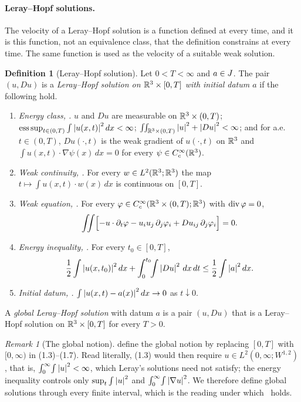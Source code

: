 \documentclass[11pt,letterpaper]{article}
\numberwithin{equation}{section}
\theoremstyle{plain}
\theoremstyle{definition}
\newtheorem{definition}[theorem]{Definition}
\theoremstyle{remark}
\newtheorem{remark}[theorem]{Remark}
\begin{document}
\paragraph{Leray--Hopf solutions.}
The velocity of a Leray--Hopf solution is a function defined at every time,
and it is this function, not an equivalence class, that the definition
constrains at every time. The same function is used as the velocity of a
suitable weak solution.

\begin{definition}[Leray--Hopf solution]\label{def:leray-hopf}
Let $0<T<\infty$ and $a\in J$. The pair $(u,Du)$ is a \emph{Leray--Hopf
solution on $\mathbb{R}^3\times[0,T]$ with initial datum $a$} if the following hold.
\begin{enumerate}[label=(LH\arabic*)]
\item\label{LH:class} \emph{Energy class, \cite[(1.3)]{ESS2003}.} $u$ and $Du$
  are measurable on $\mathbb{R}^3\times(0,T)$;
  $\operatorname*{ess\,sup}_{t\in(0,T)}\int\left\lvert u(x,t)\right\rvert^2dx<\infty$;
  $\iint_{\mathbb{R}^3\times(0,T)}\left\lvert u\right\rvert^2+\left\lvert Du\right\rvert^2<\infty$; and for a.e.\
  $t\in(0,T)$, $Du(\cdot,t)$ is the weak gradient of $u(\cdot,t)$ on $\mathbb{R}^3$
  and $\int u(x,t)\cdot\nabla\psi(x)\,dx=0$ for every $\psi\in C_c^\infty(\mathbb{R}^3)$.
\item\label{LH:weakcont} \emph{Weak continuity, \cite[(1.4)]{ESS2003}.} For
  every $w\in L^2(\mathbb{R}^3;\mathbb{R}^3)$ the map $t\mapsto\int u(x,t)\cdot w(x)\,dx$ is
  continuous on $[0,T]$.
\item\label{LH:eq} \emph{Weak equation, \cite[(1.5)]{ESS2003}.} For every
  $\varphi\in C_c^\infty(\mathbb{R}^3\times(0,T);\mathbb{R}^3)$ with $\operatorname{div}\varphi=0$,
  \[
  \iint\Bigl[-u\cdot\partial_t\varphi-u_iu_j\,\partial_j\varphi_i+Du_{ij}\,\partial_j\varphi_i\Bigr]=0 .
  \]
\item\label{LH:energy} \emph{Energy inequality, \cite[(1.6)]{ESS2003}.} For
  every $t_0\in[0,T]$,
  \[
  \frac12\int\left\lvert u(x,t_0)\right\rvert^2dx+\int_0^{t_0}\!\!\int\left\lvert Du\right\rvert^2\,dx\,dt\le\frac12\int\left\lvert a\right\rvert^2dx .
  \]
\item\label{LH:initial} \emph{Initial datum, \cite[(1.7)]{ESS2003}.}
  $\int\left\lvert u(x,t)-a(x)\right\rvert^2dx\to0$ as $t\downarrow0$.
\end{enumerate}
A \emph{global Leray--Hopf solution} with datum $a$ is a pair $(u,Du)$ that is
a Leray--Hopf solution on $\mathbb{R}^3\times[0,T]$ for every $T>0$.
\end{definition}

\begin{remark}[The global notion]\label{rem:global-LH}
\cite{ESS2003} define the global notion by replacing $[0,T]$ with $[0,\infty)$
in (1.3)--(1.7). Read literally, (1.3) would then require
$u\in L^2(0,\infty;W^{1,2})$, that is, $\int_0^\infty\!\int\left\lvert u\right\rvert^2<\infty$,
which Leray's solutions need not satisfy; the energy inequality controls
only $\sup_t\int\left\lvert u\right\rvert^2$ and $\int_0^\infty\!\int\left\lvert \nabla u\right\rvert^2$. We therefore
define global solutions through every finite interval, which is the reading
under which~\cite[Theorem~1.1]{ESS2003} holds.
\end{remark}
\end{document}
